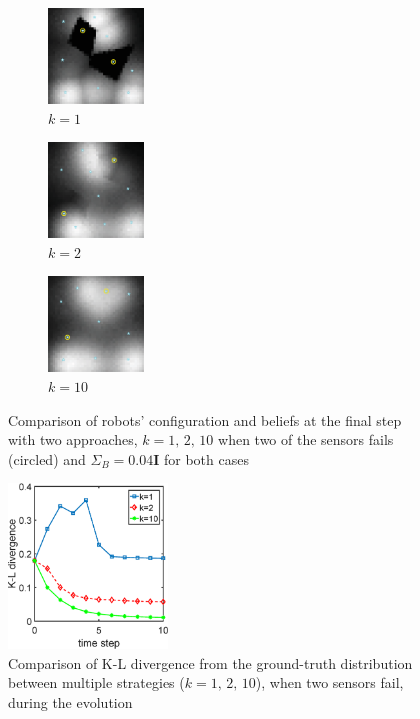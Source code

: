 \documentclass[journal]{IEEEtran}
\begin{document}
\begin{figure}
	\centering
	\begin{subfigure}[b]{0.15\textwidth}
		\centering
		\includegraphics[width=1in]{figure/fault_order_1}
		\caption{$k=1$}
	\end{subfigure}
	\begin{subfigure}[b]{0.15\textwidth}
		\centering
		\includegraphics[width=1in]{figure/fault_order_2}
		\caption{$k=2$}
	\end{subfigure}
	\begin{subfigure}[b]{0.15\textwidth}
	\centering
	\includegraphics[width=1in]{figure/fault_order_n}
	\caption{$k=10$}
\end{subfigure}
	\caption{Comparison of robots' configuration and beliefs at the final step with two approaches, $k=1, \,2,\,10$ when two of the sensors fails (circled) and $\Sigma_B = 0.04\mathbf{I}$ for both cases }
	\label{fig:fig6}
\end{figure}
\begin{figure}
	\centering
	\includegraphics[width=1.67in]{figure/fault_kl2}
	\caption{Comparison of K-L divergence from the ground-truth distribution between multiple strategies ($k=1,\,2,\,10$), when two sensors fail, during the evolution}
	\label{fig:fig7}
\end{figure}
\end{document}

